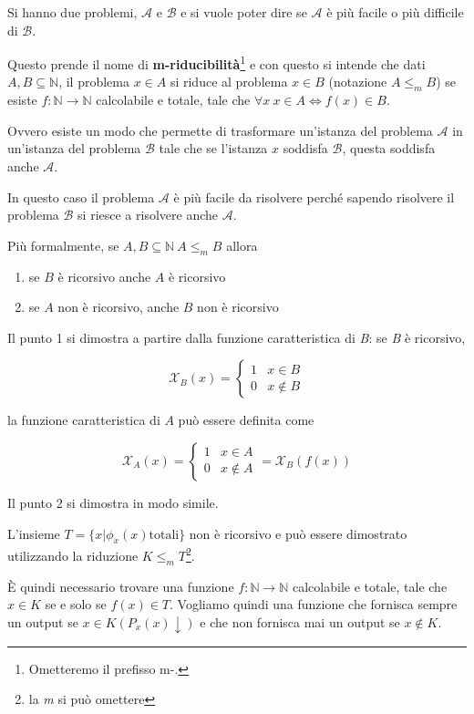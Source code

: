 Si hanno due problemi, $ \mathcal{A} $ e $ \mathcal{B} $ e si vuole poter dire se $ \mathcal{A} $ è più facile o più difficile di $ \mathcal{B} $.

Questo prende il nome di \textbf{m-riducibilità}\footnote{Ometteremo il prefisso m-.} e con questo si intende che dati $ A,B \subseteq \mathbb{N} $, il problema $ x \in A $ si riduce al problema $ x \in B $ (notazione $ A \leq_m B $) se esiste $ f : \mathbb{N} \rightarrow \mathbb{N} $ calcolabile e totale, tale che $ \forall x \: x \in A \Leftrightarrow f(x) \in B$.

Ovvero esiste un modo che permette di trasformare un'istanza del problema $ \mathcal{A} $ in un'istanza del problema $ \mathcal{B} $ tale che se l'istanza $ x $ soddisfa $ \mathcal{B} $, questa soddisfa anche $ \mathcal{A} $.

In questo caso il problema $ \mathcal{A} $ è più facile da risolvere perché sapendo risolvere il problema $ \mathcal{B} $ si riesce a risolvere anche $ \mathcal{A} $.

Più formalmente, se $ A, B \subseteq \mathbb{N} \: A \leq_m B $ allora

\begin{enumerate}
	\item se $ B $ è ricorsivo anche $ A $ è ricorsivo
	\item se $A $ non è ricorsivo, anche $ B $ non è ricorsivo
\end{enumerate}

Il punto 1 si dimostra a partire dalla funzione caratteristica di \textit{B}: se \textit{B} è ricorsivo,

$$
\mathcal{X}_B(x) = \begin{cases}
1 & x \in B \\
0 & x \notin B
\end{cases}
$$

la funzione caratteristica di $ A $ può essere definita come

$$
\mathcal{X}_A(x) = \begin{cases}
1 & x \in A \\
0 & x \notin A
\end{cases} = \mathcal{X}_B(f(x))
$$

Il punto 2 si dimostra in modo simile.

L'insieme $ T = \{x | \phi_x(x) \text{totali}\} $ non è ricorsivo e può essere dimostrato utilizzando la riduzione $ K \leq_m T $\footnote{la \textit{m} si può omettere}.

\`E quindi necessario trovare una funzione $ f : \mathbb{N} \rightarrow \mathbb{N} $ calcolabile e totale, tale che $ x \in K $ se e solo se $ f(x) \in T $.
Vogliamo quindi una funzione che fornisca sempre un output se $ x \in K (P_x(x)\downarrow)$ e che non fornisca mai un output se $ x \notin K $.

